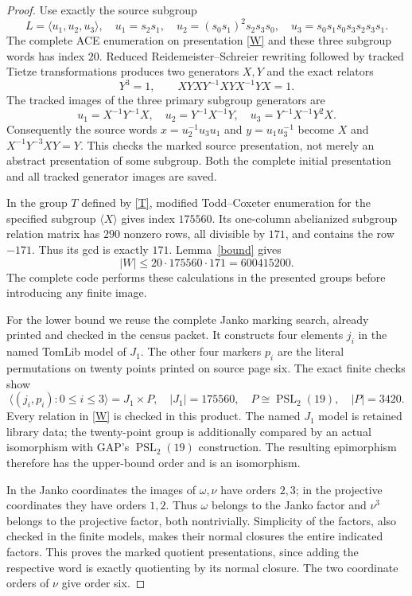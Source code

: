 \documentclass[11pt,a4paper]{article}
\newcommand{\PSL}{\operatorname{PSL}}\newcommand{\Aut}{\operatorname{Aut}}
\begin{document}
\begin{proof}
Use exactly the source subgroup
\[
 L=\langle u_1,u_2,u_3\rangle,\quad
 u_1=s_2s_1,\quad u_2=(s_0s_1)^2s_2s_3s_0,\quad
 u_3=s_0s_1s_0s_3s_2s_3s_1.
\]
The complete ACE enumeration on presentation \eqref{W} and these three subgroup words has index $20$. Reduced Reidemeister--Schreier rewriting followed by tracked Tietze transformations produces two generators $X,Y$ and the exact relators
\begin{equation}\label{T}
 Y^3=1,\qquad XYXY^{-1}XYX^{-1}YX=1.
\end{equation}
The tracked images of the three primary subgroup generators are
\[
 u_1=X^{-1}Y^{-1}X,\quad u_2=Y^{-1}X^{-1}Y,
 \quad u_3=Y^{-1}X^{-1}Y^2X.
\]
Consequently the source words $x=u_2^{-1}u_3u_1$ and $y=u_1u_3^{-1}$ become $X$ and $X^{-1}Y^{-3}XY=Y$. This checks the marked source presentation, not merely an abstract presentation of some subgroup. Both the complete initial presentation and all tracked generator images are saved.

In the group $T$ defined by \eqref{T}, modified Todd--Coxeter enumeration for the specified subgroup $\langle X\rangle$ gives index $175560$. Its one-column abelianized subgroup relation matrix has $290$ nonzero rows, all divisible by $171$, and contains the row $-171$. Thus its gcd is exactly $171$. Lemma~\ref{bound} gives
\[
 |W|\leq20\cdot175560\cdot171=600415200.
\]
The complete code performs these calculations in the presented groups before introducing any finite image.

For the lower bound we reuse the complete Janko marking search, already printed and checked in the census packet. It constructs four elements $j_i$ in the named TomLib model of $J_1$. The other four markers $p_i$ are the literal permutations on twenty points printed on source page six. The exact finite checks show
\[
 \langle(j_i,p_i):0\leq i\leq3\rangle=J_1\times P,
 \quad |J_1|=175560,\quad P\cong\PSL_2(19),\quad |P|=3420.
\]
Every relation in \eqref{W} is checked in this product. The named $J_1$ model is retained library data; the twenty-point group is additionally compared by an actual isomorphism with GAP's $\PSL_2(19)$ construction. The resulting epimorphism therefore has the upper-bound order and is an isomorphism.

In the Janko coordinates the images of $\omega,\nu$ have orders $2,3$; in the projective coordinates they have orders $1,2$. Thus $\omega$ belongs to the Janko factor and $\nu^3$ belongs to the projective factor, both nontrivially. Simplicity of the factors, also checked in the finite models, makes their normal closures the entire indicated factors. This proves the marked quotient presentations, since adding the respective word is exactly quotienting by its normal closure. The two coordinate orders of $\nu$ give order six.
\end{proof}
\end{document}
